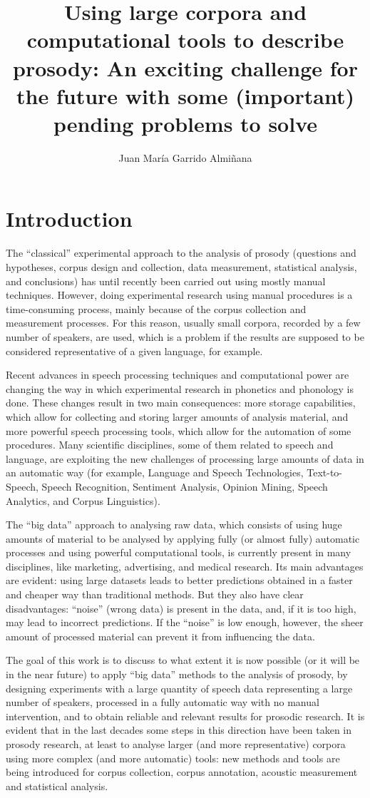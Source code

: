 \documentclass[output=paper]{langsci/langscibook}
\author{Juan María Garrido Almiñana\affiliation{National Distance Education University}}
\title{Using large corpora and computational tools to describe prosody: An exciting challenge for the future with some (important) pending problems to solve}
\begin{document}
\label{chap:gar2}\label{ch:1}

\section{Introduction}
The ``classical'' experimental approach to the analysis of prosody (questions and hypotheses, corpus design and collection, data measurement, statistical analysis, and conclusions) has until recently been carried out using mostly manual techniques. However, doing experimental research using manual procedures is a time-consuming process, mainly because of the corpus collection and measurement processes. For this reason, usually small corpora, recorded by a few number of speakers, are used, which is a problem if the results are supposed to be considered representative of a given language, for example.

Recent advances in speech processing techniques and computational power are changing the way in which experimental research in phonetics and phonology is done. These changes result in two main consequences: more storage capabilities, which allow for collecting and storing larger amounts of analysis material, and more powerful speech processing tools, which allow for the automation of some procedures. Many scientific disciplines, some of them related to speech and language, are exploiting the new challenges of processing large amounts of data in an automatic way (for example, Language and Speech Technologies, Text-to-Speech, Speech Recognition, Sentiment Analysis, Opinion Mining, Speech Analytics, and Corpus Linguistics). 

The ``big data'' approach to analysing raw data, which consists of using huge amounts of material to be analysed by applying fully (or almost fully) automatic processes and using powerful computational tools, is currently present in many disciplines, like marketing, advertising, and medical research. Its main advantages are evident: using large datasets leads to better predictions obtained in a faster and cheaper way than traditional methods. But they also have clear disadvantages: ``noise'' (wrong data) is present in the data, and, if it is too high, may lead to incorrect predictions. If the ``noise'' is low enough, however, the sheer amount of processed material can prevent it from influencing the data.

The goal of this work is to discuss to what extent it is now possible (or it will be in the near future) to apply ``big data'' methods to the analysis of prosody, by designing experiments with a large quantity of speech data representing a large number of speakers, processed in a fully automatic way with no manual intervention, and to obtain reliable and relevant results for prosodic research. It is evident that in the last decades some steps in this direction have been taken in prosody research, at least to analyse larger (and more representative) corpora using more complex (and more automatic) tools: new methods and tools are being introduced for corpus collection, corpus annotation, acoustic measurement and statistical analysis. 
\end{document}
